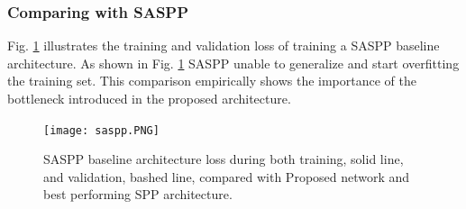 \subsubsection{Comparing with SASPP}
Fig. \ref{saspp} illustrates the training and validation loss of training a SASPP baseline architecture. As shown in Fig. \ref{saspp} SASPP unable to generalize and start overfitting the training set. This comparison empirically shows the importance of the bottleneck introduced in the proposed architecture.

\begin{center}
\begin{figure}[htbp]
\centerline{\texttt{[image: saspp.PNG]}}
\caption{SASPP baseline architecture loss during both training, solid line, and validation, bashed line, compared with Proposed network and best performing SPP architecture.}
\label{saspp}
\end{figure}
\end{center}

